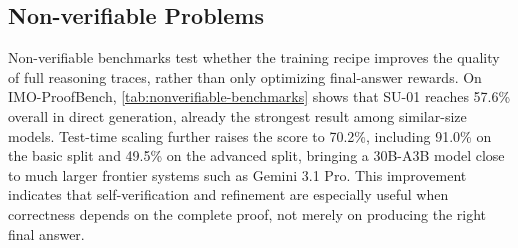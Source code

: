 \subsection{Non-verifiable Problems}

Non-verifiable benchmarks test whether the training recipe improves the quality
of full reasoning traces, rather than only optimizing final-answer rewards. On
IMO-ProofBench, \cref{tab:nonverifiable-benchmarks} shows that SU-01 reaches
57.6\% overall in direct generation, already the strongest result among
similar-size models. Test-time scaling further raises the score to 70.2\%,
including 91.0\% on the basic split and 49.5\% on the advanced split, bringing a
30B-A3B model close to much larger frontier systems such as Gemini 3.1 Pro. This improvement indicates
that self-verification and refinement are especially useful when correctness
depends on the complete proof, not merely on producing the right final answer.

\begin{table}
  \centering
  \captionsetup{type=table,hypcap=false}
  \caption{Performance on physics olympiad problems, averaged over 8 runs. Gold lines for IPhO 2024/2025 are
  20.8/19.7 points. For SU-01, $x/y$ reports scores without and with test-time scaling. 
  }
  \vspace{-0.75em}
  \label{tab:ipho-problems}
  \setlength{\tabcolsep}{3.0pt}
  \renewcommand{\arraystretch}{1.}
  \small
  \vspace{-1.0em}
  \end{table}
  
